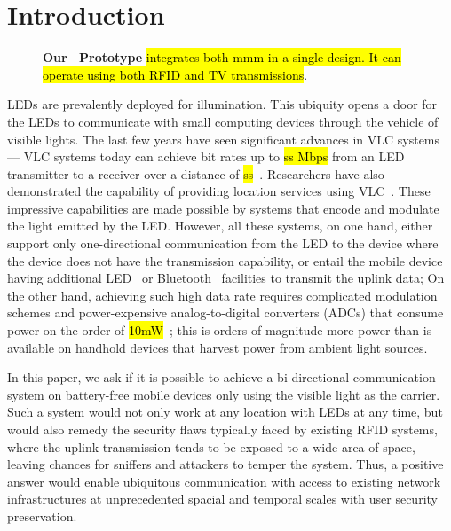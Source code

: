 \section{Introduction}

\begin{figure}[!t]
\vskip -0.03in
  \centering
      {
      }
\caption{{\bf Our \vitag\ Prototype} \hl{integrates both mmm in a single design. It can operate using both RFID and TV transmissions}.}
\label{fig:tag}
\vskip -0.05in
\end{figure}

LEDs are prevalently deployed for illumination. This ubiquity opens a door for the LEDs to communicate with small computing devices through the vehicle of visible lights. The last few years have seen significant advances in VLC systems --- VLC systems today can achieve bit rates up to \hl{ss Mbps} from an LED transmitter to a receiver over a distance of \hl{ss}~\cite{flawedsys1,flawedsys2,flawedsys3,flawedsys4}. Researchers have also demonstrated the capability of providing location services using VLC~\cite{location1,location2}. These impressive capabilities are made possible by systems that encode and modulate the light emitted by the LED. However, all these systems, on one hand, either support only one-directional communication from the LED to the device where the device does not have the transmission capability, or entail the mobile device having additional LED~\cite{led2led1} or Bluetooth~\cite{ble1} facilities to transmit the uplink data; On the other hand, achieving such high data rate requires complicated modulation schemes and power-expensive analog-to-digital converters (ADCs) that consume power on the order of \hl{10mW}~\cite{flawedsys1}; this is orders of magnitude more power than is available on handhold devices that harvest power from ambient light sources.

In this paper, we ask if it is possible to achieve a bi-directional communication system on battery-free mobile devices only using the visible light as the carrier. Such a system would not only work at any location with LEDs at any time, but would also remedy the security flaws typically faced by existing RFID systems, where the uplink transmission tends to be exposed to a wide area of space, leaving chances for sniffers and attackers to temper the system. Thus, a positive answer would enable ubiquitous communication with access to existing network infrastructures at unprecedented spacial and temporal scales with user security preservation. 

